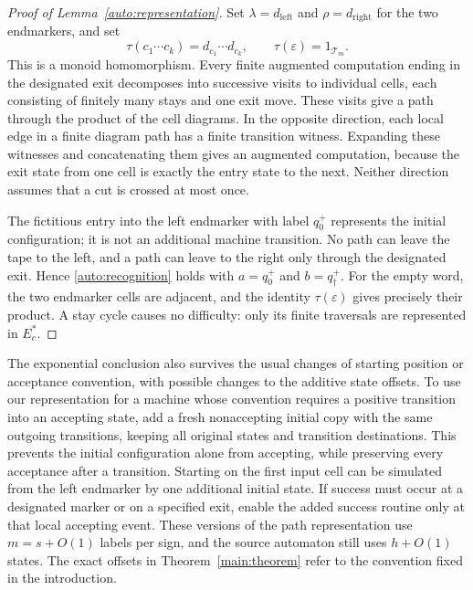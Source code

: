\begin{proof}[Proof of Lemma~\ref{auto:representation}]
Set $\lambda=d_{\mathrm{left}}$ and
$\rho=d_{\mathrm{right}}$ for the two endmarkers, and set
\[
  \tau(c_1\cdots c_k)=d_{c_1}\cdots d_{c_k},
  \qquad \tau(\varepsilon)=1_{\mathcal T_m}.
\]
This is a monoid homomorphism.  Every finite augmented computation
ending in the designated exit decomposes into successive visits to
individual cells, each consisting of finitely many stays and one
exit move.  These visits give a path through the product of the cell
diagrams.  In the opposite direction, each local edge in a finite
diagram path has a finite transition witness.  Expanding these
witnesses and concatenating them gives an augmented computation,
because the exit state from one cell is exactly the entry state to
the next.  Neither direction assumes that a cut is crossed at most
once.

The fictitious entry into the left endmarker with label $q_0^+$
represents the initial configuration; it is not an additional machine
transition.  No path can leave the tape to the left, and a path can
leave to the right only through the designated exit.  Hence
\eqref{auto:recognition} holds with $a=q_0^+$ and $b=q_\dagger^+$.
For the empty word, the two endmarker cells are adjacent, and the
identity $\tau(\varepsilon)$ gives precisely their product.  A stay
cycle causes no difficulty: only its finite traversals are represented
in $E_c^*$.
\end{proof}

\begin{remark}\label{auto:conventions}
The exponential conclusion also survives the usual changes of starting
position or acceptance convention, with possible changes to the additive
state offsets. To use our representation for a machine whose convention
requires a positive transition into an accepting state, add a fresh
nonaccepting initial copy with the same outgoing transitions, keeping all original states and
transition destinations. This prevents the initial configuration alone
from accepting, while preserving every acceptance after a transition.
Starting on the first input cell can be simulated from the left
endmarker by one additional initial state. If success must occur at a designated marker or on a specified
exit, enable the added success routine only at that local accepting
event. These versions of the path representation use $m=s+O(1)$ labels
per sign, and the source automaton still uses $h+O(1)$ states. The exact
offsets in Theorem~\ref{main:theorem} refer to the convention fixed in
the introduction.
\end{remark}

